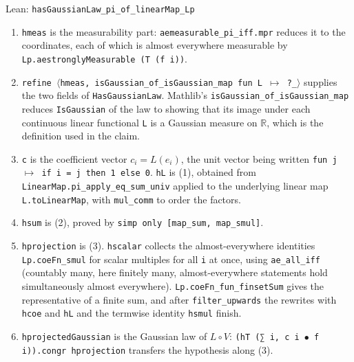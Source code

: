 \documentclass[11pt,a4paper]{article}
\begin{document}
\begin{leanbox}{Lean: \texttt{hasGaussianLaw\_\allowbreak{}pi\_\allowbreak{}of\_\allowbreak{}linearMap\_\allowbreak{}Lp}}
\begin{enumerate}
\item \texttt{hmeas} is the measurability part: \texttt{aemeasurable\_\allowbreak{}pi\_\allowbreak{}iff.\allowbreak{}mpr} reduces it to the coordinates, each of which is almost everywhere measurable by \texttt{Lp.\allowbreak{}aestrongly\allowbreak{}Measurable (T (f i))}.

\item \texttt{refine \ensuremath{\langle}hmeas, is\allowbreak{}Gaussian\_\allowbreak{}of\_\allowbreak{}is\allowbreak{}Gaussian\_\allowbreak{}map fun L \ensuremath{\mapsto} ?\_\allowbreak{}\ensuremath{\rangle}} supplies the two fields of \texttt{Has\allowbreak{}Gaussian\allowbreak{}Law}. Mathlib's \texttt{is\allowbreak{}Gaussian\_\allowbreak{}of\_\allowbreak{}is\allowbreak{}Gaussian\_\allowbreak{}map} reduces \texttt{Is\allowbreak{}Gaussian} of the law to showing that its image under each continuous linear functional \texttt{L} is a Gaussian measure on \(\mathbb R\), which is the definition used in the claim.

\item \texttt{c} is the coefficient vector \(c_i=L(e_i)\), the unit vector being written \texttt{fun j \ensuremath{\mapsto} if i = j then 1 else 0}. \texttt{h\allowbreak{}L} is (1), obtained from \texttt{Linear\allowbreak{}Map.\allowbreak{}pi\_\allowbreak{}apply\_\allowbreak{}eq\_\allowbreak{}sum\_\allowbreak{}univ} applied to the underlying linear map \texttt{L.\allowbreak{}to\allowbreak{}Linear\allowbreak{}Map}, with \texttt{mul\_\allowbreak{}comm} to order the factors.

\item \texttt{hsum} is (2), proved by \texttt{simp only [map\_\allowbreak{}sum, map\_\allowbreak{}smul]}.

\item \texttt{hprojection} is (3). \texttt{hscalar} collects the almost-everywhere identities \texttt{Lp.\allowbreak{}coe\allowbreak{}Fn\_\allowbreak{}smul} for scalar multiples for all \texttt{i} at once, using \texttt{ae\_\allowbreak{}all\_\allowbreak{}iff} (countably many, here finitely many, almost-everywhere statements hold simultaneously almost everywhere). \texttt{Lp.\allowbreak{}coe\allowbreak{}Fn\_\allowbreak{}fun\_\allowbreak{}finset\allowbreak{}Sum} gives the representative of a finite sum, and after \texttt{filter\_\allowbreak{}upwards} the rewrites with \texttt{hcoe} and \texttt{h\allowbreak{}L} and the termwise identity \texttt{hsmul} finish.

\item \texttt{hprojected\allowbreak{}Gaussian} is the Gaussian law of \(L\circ V\): \texttt{(h\allowbreak{}T (∑ i, c i \ensuremath{\bullet} f i)).\allowbreak{}congr hprojection} transfers the hypothesis along (3).


\end{enumerate}
\end{leanbox}
\end{document}
